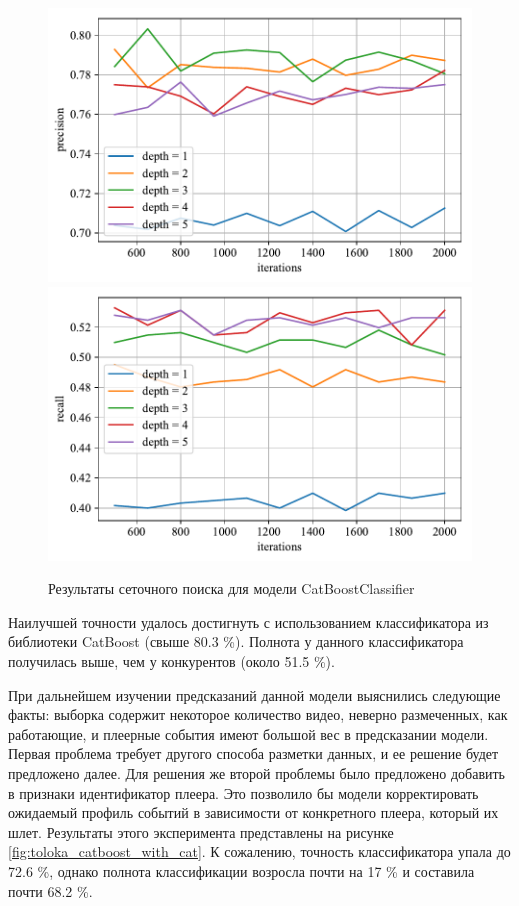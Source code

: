 \begin{figure}
    \centering
    \includegraphics{../images/toloka_catboost_precision.pdf}
    \includegraphics{../images/toloka_catboost_recall.pdf}
    \caption{Результаты сеточного поиска для модели CatBoostClassifier}
    \label{fig:toloka_catboost}
\end{figure}

Наилучшей точности удалось достигнуть с использованием классификатора из библиотеки CatBoost (свыше 80.3 \%). Полнота у данного классификатора получилась выше, чем у конкурентов (около 51.5 \%).

При дальнейшем изучении предсказаний данной модели выяснились следующие факты: выборка содержит некоторое количество видео, неверно размеченных, как работающие, и плеерные события имеют большой вес в предсказании модели. Первая проблема требует другого способа разметки данных, и ее решение будет предложено далее. Для решения же второй проблемы было предложено добавить в признаки идентификатор плеера. Это позволило бы модели корректировать ожидаемый профиль событий в зависимости от конкретного плеера, который их шлет. Результаты этого эксперимента представлены на рисунке \ref{fig:toloka_catboost_with_cat}. К сожалению, точность классификатора упала до 72.6 \%, однако полнота классификации возросла почти на 17 \% и составила почти 68.2 \%.

